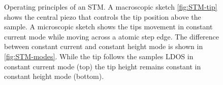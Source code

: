 \begin{figure}\centering
	\caption{Operating principles of an STM. A macroscopic sketch \ref{fig:STM-tip} shows the central piezo that controls the tip position above the sample. A microscopic sketch shows the tips movement in constant current mode while moving across a atomic step edge. The difference between constant current and constant height mode is shown in \ref{fig:STM-modes}. While the tip follows the samples LDOS in constant current mode (top) the tip height remains constant in constant height mode (bottom).}
	\label{fig:STM-sketch}
\end{figure}

